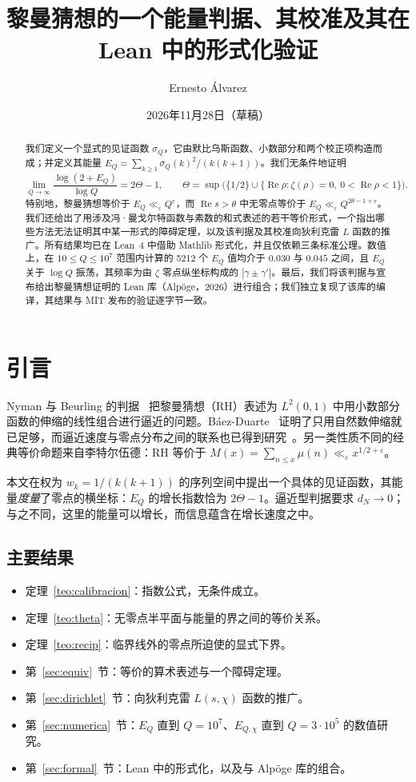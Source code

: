 \documentclass[11pt,a4paper]{amsart}
\title[黎曼猜想的一个能量判据]{黎曼猜想的一个能量判据、其校准及其在 Lean 中的形式化验证}
\author{Ernesto \'Alvarez}
\date{2026年11月28日（草稿）}
\theoremstyle{definition}
\theoremstyle{remark}
\renewcommand{\Re}{\operatorname{Re}}
\begin{document}
\begin{abstract}
我们定义一个显式的见证函数 $\sigma_Q$，它由默比乌斯函数、小数部分和两个校正项构造而成；并定义其能量 $E_Q=\sum_{k\ge1}\sigma_Q(k)^2/(k(k+1))$。我们无条件地证明
\[
  \lim_{Q\to\infty}\frac{\log(2+E_Q)}{\log Q}=2\Theta-1,
  \qquad \Theta=\sup\bigl(\{1/2\}\cup\{\Re\rho:\zeta(\rho)=0,\ 0<\Re\rho<1\}\bigr).
\]
特别地，黎曼猜想等价于 $E_Q\ll_\varepsilon Q^\varepsilon$，而 $\Re s>\theta$ 中无零点等价于 $E_Q\ll_\varepsilon Q^{2\theta-1+\varepsilon}$。我们还给出了用涉及冯·曼戈尔特函数与素数的和式表述的若干等价形式，一个指出哪些方法无法证明其中某一形式的障碍定理，以及该判据及其校准向狄利克雷 $L$ 函数的推广。所有结果均已在 Lean~4 中借助 Mathlib 形式化，并且仅依赖三条标准公理。数值上，在 $10\le Q\le10^7$ 范围内计算的 5212 个 $E_Q$ 值均介于 $0.030$ 与 $0.045$ 之间，且 $E_Q$ 关于 $\log Q$ 振荡，其频率为由 $\zeta$ 零点纵坐标构成的 $|\gamma\pm\gamma'|$。最后，我们将该判据与宣布给出黎曼猜想证明的 Lean 库（Alp\"oge，2026）进行组合；我们独立复现了该库的编译，其结果与 MIT 发布的验证逐字节一致。
\end{abstract}

\maketitle

\section{引言}

Nyman 与 Beurling 的判据~\cite{Nyman,Beurling} 把黎曼猜想（RH）表述为 $L^2(0,1)$ 中用小数部分函数的伸缩的线性组合进行逼近的问题。B\'aez-Duarte~\cite{BaezDuarte} 证明了只用自然数伸缩就已足够，而逼近速度与零点分布之间的联系也已得到研究~\cite{BalazardSaias,Burnol,BCF}。另一类性质不同的经典等价命题来自李特尔伍德：RH 等价于 $M(x)=\sum_{n\le x}\mu(n)\ll_\varepsilon x^{1/2+\varepsilon}$。

本文在权为 $w_k=1/(k(k+1))$ 的序列空间中提出一个具体的见证函数，其能量\emph{度量}了零点的横坐标：$E_Q$ 的增长指数恰为 $2\Theta-1$。逼近型判据要求 $d_N\to0$；与之不同，这里的能量可以增长，而信息蕴含在增长速度之中。

\subsection*{主要结果}
\begin{itemize}
\item 定理~\ref{teo:calibracion}：指数公式，无条件成立。
\item 定理~\ref{teo:theta}：无零点半平面与能量的界之间的等价关系。
\item 定理~\ref{teo:recip}：临界线外的零点所迫使的显式下界。
\item 第~\ref{sec:equiv}~节：等价的算术表述与一个障碍定理。
\item 第~\ref{sec:dirichlet}~节：向狄利克雷 $L(s,\chi)$ 函数的推广。
\item 第~\ref{sec:numerica}~节：$E_Q$ 直到 $Q=10^7$、$E_{Q,\chi}$ 直到 $Q=3\cdot10^5$ 的数值研究。
\item 第~\ref{sec:formal}~节：Lean 中的形式化，以及与 Alp\"oge 库的组合。
\end{itemize}
\end{document}
